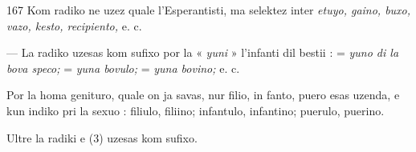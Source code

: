 \begin{VUpage}[171]{167}
Kom radiko ne uzez  quale l'Esperantisti, ma selektez\nl
inter \textit{etuyo, gaino, buxo, vazo, kesto, recipiento,} e. c.

 --- La radiko  uzesas kom sufixo por la « \textit{yuni} »\nl
l'infanti dil bestii :  = \textit{yuno di la bova speco;} \cc
{} = \textit{yuna bovulo;}  = \textit{yuna bovino;} \nl
{} e. c.

Por la homa genituro, quale on ja savas, nur filio, in\cc
fanto, puero esas uzenda, e kun indiko pri la sexuo : filiulo,\nl
filiino; infantulo, infantino; puerulo, puerino.

Ultre  la radiki   e  (3) uzesas kom sufixo.
\end{VUpage}


